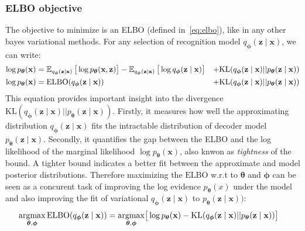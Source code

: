 \subsubsection{ELBO objective}
The objective to minimize is an ELBO (defined in~\ref{eq:elbo}), like in any other bayes variational methods. For any selection of recognition model $q_{\boldsymbol{\phi}}(\mathbf{z}\mid \mathbf{x})$,
we can write:
\begin{align}
    \label{eq:vae}
    \log p_{\boldsymbol{\theta}}(\mathbf{x})  &= \operatorname{\mathbb{E}}_{q_{\boldsymbol{\phi}}(\mathbf{z}\mid \mathbf{x})} \big[\log p_{\boldsymbol{\theta}}(\mathbf{x},\mathbf{z})\big] - \operatorname{\mathbb{E}}_{q_{\boldsymbol{\phi}}(\mathbf{z}\mid \mathbf{x})} \big[\log q_{\boldsymbol{\phi}}(\mathbf{z}\mid \mathbf{x})\big] &+ \mathrm{KL}(q_{\boldsymbol{\phi}}(\mathbf{z}\mid \mathbf{x}) || p_{\boldsymbol{\theta}}(\mathbf{z} \mid  \mathbf{x})) \\
    \log p_{\boldsymbol{\theta}}(\mathbf{x})  &= \mathrm{ELBO}(q_{\boldsymbol{\phi}}(\mathbf{z}\mid \mathbf{x})) &+ \mathrm{KL}(q_{\boldsymbol{\phi}}(\mathbf{z}\mid \mathbf{x}) || p_{\boldsymbol{\theta}}(\mathbf{z} \mid  \mathbf{x}))
\end{align}
This equation provides important insight into the divergence $\mathrm{KL}(q_{\boldsymbol{\phi}}(\mathbf{z}\mid \mathbf{x}) || p_{\boldsymbol{\theta}}(\mathbf{z} \mid  \mathbf{x}))$. 
Firstly, it measures how well the approximating distribution $q_{\boldsymbol{\phi}}(\mathbf{z}\mid \mathbf{x})$ fits the intractable distribution of decoder 
model $p_{\boldsymbol{\theta}}(\mathbf{z} \mid  \mathbf{x})$. Secondly, it quantifies the gap between the ELBO and the log likelihood of the marginal likelihood 
$\log p_{\boldsymbol{\theta}}(\mathbf{x})$, also knwon as \textit{tightness} of the bound. A tighter bound indicates a better fit between the approximate 
and model posterior distributions. Therefore maximizing the $\mathrm{ELBO}$ w.r.t to ${\boldsymbol{\theta}}$ and ${\boldsymbol{\phi}}$ can be seen as a concurent task of 
improving the log evidence $p_{\boldsymbol{\theta}}(x)$ under the model and also improving the fit of variational $q_{\boldsymbol{\phi}}(\mathbf{z}\mid \mathbf{x})$ to 
$p_{\boldsymbol{\theta}}(\mathbf{z} \mid  \mathbf{x}))$:
\begin{align}
    \label{eq:opt_vae}
    \mathop{\rm argmax}_{{\boldsymbol{\theta}},{\boldsymbol{\phi}}} \mathrm{ELBO}(q_{\boldsymbol{\phi}}(\mathbf{z}\mid \mathbf{x})) &= \mathop{\rm argmax}_{{\boldsymbol{\theta}},{\boldsymbol{\phi}}} \bigr[ \log p_{\boldsymbol{\theta}}(\mathbf{x}) - \mathrm{KL}(q_{\boldsymbol{\phi}}(\mathbf{z}\mid \mathbf{x}) || p_{\boldsymbol{\theta}}(\mathbf{z} \mid  \mathbf{x})) \bigl] 
\end{align}
